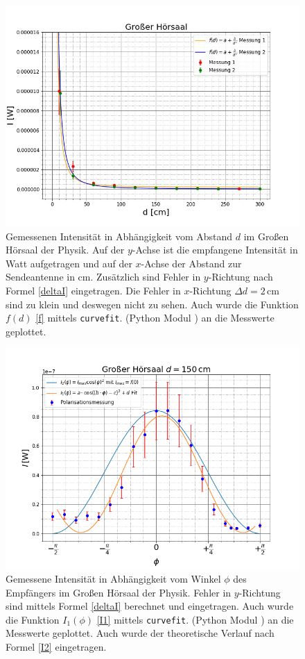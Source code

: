\documentclass[titlepage,11pt,a4paper,ngerman]{article}
\begin{document}
\begin{figure}[ht]
	\centering
	\includegraphics[scale=0.55]{Bilder/bsp2}
	\caption{Gemessenen Intensität in Abhängigkeit vom Abstand $d$ im Großen Hörsaal der Physik. Auf der $y$-Achse ist die empfangene Intensität in Watt aufgetragen und auf der $x$-Achse der Abstand zur Sendeantenne in cm. Zusätzlich sind Fehler in $y$-Richtung nach Formel \eqref{deltaI} eingetragen. Die Fehler in $x$-Richtung $\Delta d = 2\,$cm sind zu klein und deswegen nicht zu sehen. Auch wurde die Funktion $f(d)$ \eqref{f} mittels \texttt{curvefit}. (Python Modul \cite{curvescipy}) an die Messwerte geplottet.}
	\label{Abstand-lin}
\end{figure}

\begin{figure}
	\centering
	\includegraphics[scale=0.55]{Bilder/Polarisation-GrH}
	\caption{Gemessene Intensität in Abhängigkeit vom Winkel $\phi$ des Empfängers im Großen Hörsaal der Physik. Fehler in $y$-Richtung sind mittels Formel \eqref{deltaI} berechnet und eingetragen. Auch wurde die Funktion $I_{1}(\phi)$ \eqref{I1}  mittels \texttt{curvefit}. (Python Modul \cite{curvescipy}) an die Messwerte geplottet. Auch wurde der theoretische Verlauf nach Formel \eqref{I2} eingetragen.}
	\label{Labor-P}
\end{figure}
\end{document}
